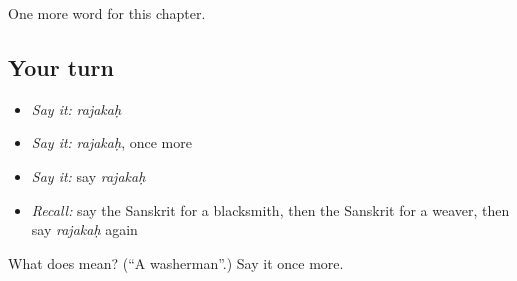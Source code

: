 \begin{grammarlens}[title={What you've built}]
One more word for this chapter.
\end{grammarlens}

\subsection*{Your turn}
\begin{itemize}
\raggedright
  \item \emph{Say it:} \emph{rajakaḥ}
  \item \emph{Say it:} \emph{rajakaḥ}, once more
  \item \emph{Say it:} say \emph{rajakaḥ}
  \item \emph{Recall:} say the Sanskrit for a blacksmith, then the Sanskrit for a weaver, then say \emph{rajakaḥ} again
\end{itemize}

\begin{tcolorbox}[breakable,colback=teal!4,colframe=teal!35!black,title={Before you move on}]
What does  mean? (\textquotedblleft{}A washerman\textquotedblright{}.) Say it once more.
\end{tcolorbox}

